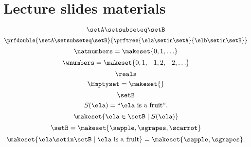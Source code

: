 
\section{Lecture slides materials}

\begin{forslides}
    \begin{equation}
        \label{eq:subset_session1_22}
        \setA \setsubseteq \setB
    \end{equation}
    \begin{equation}
        \label{eq:subset_2_session1_22}
        \prfdouble{\setA \setsubseteq \setB}{\prftree{\ela \setin \setA}{\elb \setin \setB}}
    \end{equation}
    \begin{equation}
        \label{eq:nats_session1_22}
        \natnumbers =\makeset{0,1,\ldots}
    \end{equation}
    \begin{equation}
        \label{eq:reals_session1_22}
        \wnumbers =\makeset{0,1,-1,2,-2,\ldots}
    \end{equation}
    \begin{equation}
        \label{eq:reals_2_session1_22}
        \reals
    \end{equation}
    \begin{equation}
        \label{eq:emptyset_session1_22}
        \Emptyset=\makeset{}
    \end{equation}
    \begin{equation}
        \label{eq:stat_1_session1_22}
        \setB
    \end{equation}
    \begin{equation}
        \label{eq:stat_2_session1_22}
        S(\ela) = \text{``$\ela$ is a fruit''}.
    \end{equation}
    \begin{equation}
        \label{eq:stat_3_session1_22}
        \makeset{\ela \in \setB \mid S(\ela)}
    \end{equation}
    \begin{equation}
        \label{eq:stat_4_session1_22}
        \setB=\makeset{\sapple, \sgrapes, \scarrot}
    \end{equation}
    \begin{equation}
        \label{eq:stat_5_session1_22}
        \makeset{ \ela \setin\setB \mid \ela \text{ is a fruit} } = \makeset{ \sapple, \sgrapes }.
    \end{equation}

\end{forslides}

